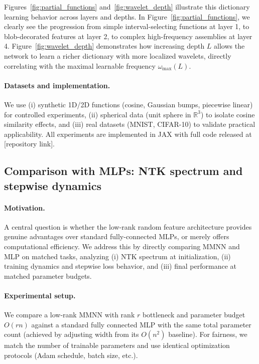 \documentclass{article}
\begin{document}
Figures~\ref{fig:partial_functions} and~\ref{fig:wavelet_depth} illustrate this dictionary learning behavior across layers and depths. In Figure~\ref{fig:partial_functions}, we clearly see the progression from simple interval-selecting functions at layer 1, to blob-decorated features at layer 2, to complex high-frequency assemblies at layer 4. Figure~\ref{fig:wavelet_depth} demonstrates how increasing depth \( L \) allows the network to learn a richer dictionary with more localized wavelets, directly correlating with the maximal learnable frequency \( \omega_{\max}(L) \).

\paragraph{Datasets and implementation.}
We use (i) synthetic 1D/2D functions (cosine, Gaussian bumps, piecewise linear) for controlled experiments, (ii) spherical data (unit sphere in \( \mathbb{R}^3 \)) to isolate cosine similarity effects, and (iii) real datasets (MNIST, CIFAR-10) to validate practical applicability. All experiments are implemented in JAX with full code released at [repository link].

\vspace{1em}
\subsection{Comparison with MLPs: NTK spectrum and stepwise dynamics}

\paragraph{Motivation.}
A central question is whether the low-rank random feature architecture provides genuine advantages over standard fully-connected MLPs, or merely offers computational efficiency. We address this by directly comparing MMNN and MLP on matched tasks, analyzing (i) NTK spectrum at initialization, (ii) training dynamics and stepwise loss behavior, and (iii) final performance at matched parameter budgets.

\paragraph{Experimental setup.}
We compare a low-rank MMNN with rank \( r \) bottleneck and parameter budget \( O(rn) \) against a standard fully connected MLP with the same total parameter count (achieved by adjusting width from its \( O(n^2) \) baseline). For fairness, we match the number of trainable parameters and use identical optimization protocols (Adam schedule, batch size, etc.).
\end{document}
